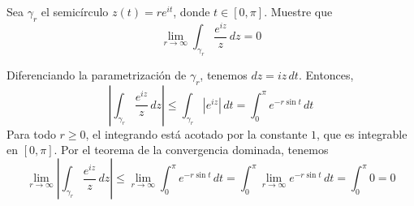\begin{exercise}
Sea $\gamma_r$ el semicírculo $z(t) = re^{it}$, donde $t \in [0, \pi]$. Muestre que
$$\lim_{r \to \infty} \int_{\gamma_r} \frac {e^{iz}} z \, dz = 0$$
\end{exercise}

\begin{solution}
Diferenciando la parametrización de $\gamma_r$, tenemos $dz = iz \, dt$. Entonces,
$$
\left| \int_{\gamma_r} \frac {e^{iz}} z \, dz \right|
    \le \int_{\gamma_r} |e^{iz}| \, dt
    = \int_0^\pi e^{-r \sin t} \, dt
$$
Para todo $r \ge 0$, el integrando está acotado por la constante $1$, que es integrable en $[0, \pi]$. Por el teorema de la convergencia dominada, tenemos
$$
\lim_{r \to \infty} \left| \int_{\gamma_r} \frac {e^{iz}} z \, dz \right|
    \le \lim_{r \to \infty} \int_0^\pi e^{-r \sin t} \, dt
    = \int_0^\pi \lim_{r \to \infty} e^{-r \sin t} \, dt
    = \int_0^\pi 0 = 0
$$
\end{solution}
